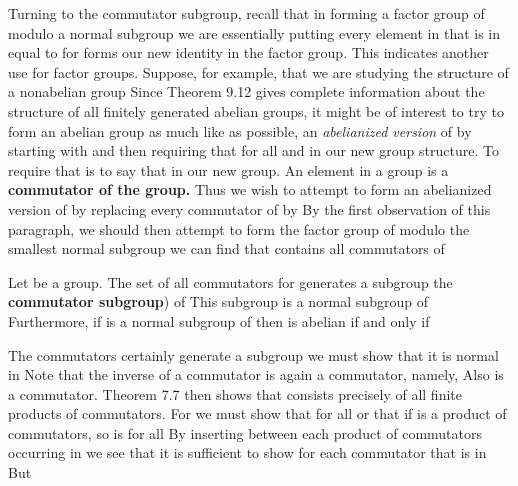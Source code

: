 \documentclass[11pt,oneside]{article}
\begin{document}
\begin{BookBody}
Turning to the commutator subgroup, recall that in forming a factor group of  modulo a normal subgroup  we are essentially putting every element in  that is in  equal to  for  forms our new identity in the factor group. This indicates another use for factor groups. Suppose, for example, that we are studying the structure of a nonabelian group  Since Theorem 9.12 gives complete information about the structure of all finitely generated abelian groups, it might be of interest to try to form an abelian group as much like  as possible, an\textit{ abelianized version} of  by starting with  and then requiring that  for all  and  in our new group structure. To require that  is to say that  in our new group. An element  in a group is a\textbf{ commutator of the group.} Thus we wish to attempt to form an abelianized version of  by replacing every commutator of  by  By the first observation of this paragraph, we should then attempt to form the factor group of  modulo the smallest normal subgroup we can find that contains all commutators of 

 Let  be a group. The set of all commutators  for  generates a subgroup the\textbf{ commutator subgroup}) of  This subgroup  is a normal subgroup of  Furthermore, if  is a normal subgroup of  then  is abelian if and only if 

 The commutators certainly generate a subgroup  we must show that it is normal in  Note that the inverse  of a commutator is again a commutator, namely,  Also  is a commutator. Theorem 7.7 then shows that  consists precisely of all finite products of commutators. For  we must show that  for all  or that if  is a product of commutators, so is  for all  By inserting  between each product of commutators occurring in  we see that it is sufficient to show for each commutator  that  is in  But


\end{BookBody}
\end{document}
